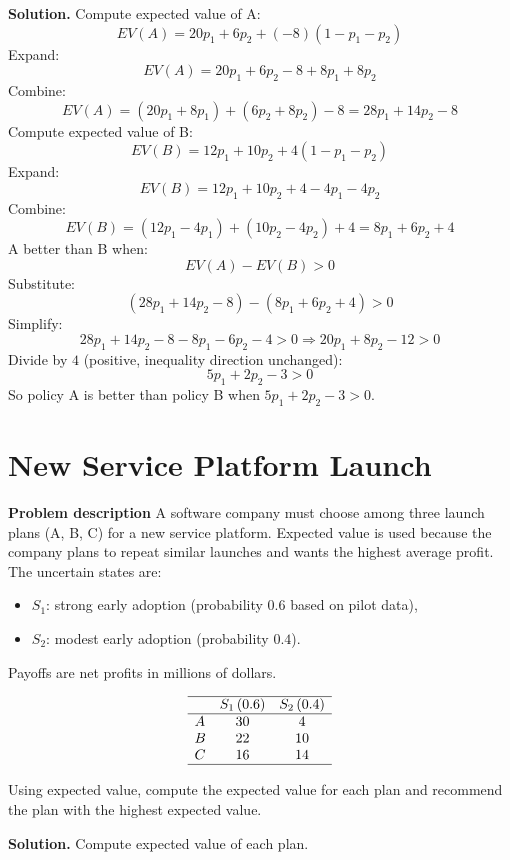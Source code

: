 \begin{ExamProblems}
		\textbf{Solution.}
		Compute expected value of A:
		\[
		EV(A)=20p_1 + 6p_2 + (-8)(1-p_1-p_2)
		\]
		Expand:
		\[
		EV(A)=20p_1 + 6p_2 -8 + 8p_1 + 8p_2
		\]
		Combine:
		\[
		EV(A)=(20p_1+8p_1) + (6p_2+8p_2) - 8 = 28p_1 + 14p_2 - 8
		\]
		Compute expected value of B:
		\[
		EV(B)=12p_1 + 10p_2 + 4(1-p_1-p_2)
		\]
		Expand:
		\[
		EV(B)=12p_1 + 10p_2 + 4 - 4p_1 - 4p_2
		\]
		Combine:
		\[
		EV(B)=(12p_1-4p_1) + (10p_2-4p_2) + 4 = 8p_1 + 6p_2 + 4
		\]
		A better than B when:
		\[
		EV(A)-EV(B)>0
		\]
		Substitute:
		\[
		(28p_1+14p_2-8)-(8p_1+6p_2+4)>0
		\]
		Simplify:
		\[
		28p_1+14p_2-8-8p_1-6p_2-4>0
		\Rightarrow 20p_1+8p_2-12>0
		\]
		Divide by \(4\) (positive, inequality direction unchanged):
		\[
		5p_1+2p_2-3>0
		\]
		So policy A is better than policy B when \(5p_1+2p_2-3>0\).
		
		
		\hypertarget{c7-ex7}{}
		\item
		\section{New Service Platform Launch}
		
		\textbf{Problem description}
		A software company must choose among three launch plans (A, B, C) for a new service platform. Expected value is used because the company plans to repeat similar launches and wants the highest average profit. The uncertain states are:
		\begin{itemize}
			\item \(S_1\): strong early adoption (probability \(0.6\) based on pilot data),
			\item \(S_2\): modest early adoption (probability \(0.4\)).
		\end{itemize}
		Payoffs are net profits in millions of dollars.
		
		\[
		\begin{array}{lcc}
			\hline
			& S_1\,(0.6) & S_2\,(0.4) \\
			\hline
			A & 30 & 4 \\
			B & 22 & 10 \\
			C & 16 & 14 \\
			\hline
		\end{array}
		\]
		
		Using expected value, compute the expected value for each plan and recommend the plan with the highest expected value.
		
		\textbf{Solution.}
		Compute expected value of each plan.
		

\end{ExamProblems}
